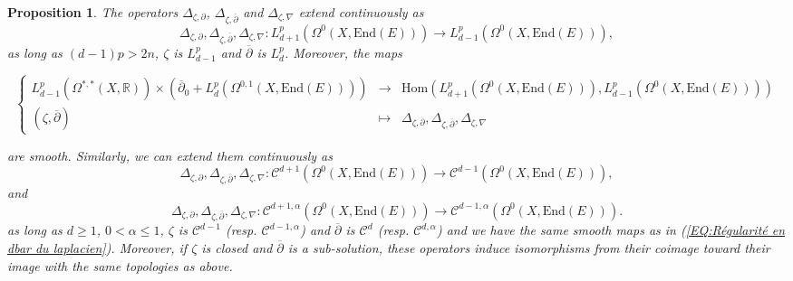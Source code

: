 \documentclass{article}
\newtheorem{proposition}[theorem]{Proposition}
\theoremstyle{remark}
\theoremstyle{definition}
\newcommand{\R}{\mathbb{R}}
\newcommand{\Hom}{\mathrm{Hom}}
\newcommand{\End}{\mathrm{End}}
\newcommand{\mC}{\mathcal{C}}
\newcommand{\dbar}{\overline{\partial}}
\renewcommand{\leq}{\leqslant}
\renewcommand{\geq}{\geqslant}
\newcommand{\fonction}[4]{\left\{ \begin{array}{rcl}
		\displaystyle #1 & \longrightarrow & \displaystyle #2\\
		\displaystyle #3 & \longmapsto & \displaystyle #4
	\end{array} \right.}
\begin{document}
\begin{proposition}\label{PRO:Régularité Z laplaciens}
    The operators $\Delta_{\zeta,\partial}$, $\Delta_{\zeta,\dbar}$ and $\Delta_{\zeta,\nabla}$ extend continuously as
    $$
    \Delta_{\zeta,\partial}, \Delta_{\zeta,\dbar}, \Delta_{\zeta,\nabla} : L_{d + 1}^p(\Omega^0(X,\End(E))) \rightarrow L_{d - 1}^p(\Omega^0(X,\End(E))),
    $$
    as long as $(d - 1)p > 2n$, $\zeta$ is $L_{d - 1}^p$ and $\dbar$ is $L_d^p$. Moreover, the maps
    \begin{adjustwidth}{-2cm}{-2cm}
    \begin{equation}\label{EQ:Régularité en dbar du laplacien}
        \fonction{L_{d - 1}^p(\Omega^{*,*}(X,\R)) \times (\dbar_0 + L_d^p(\Omega^{0,1}(X,\End(E))))}{\Hom(L_{d + 1}^p(\Omega^0(X,\End(E))),L_{d - 1}^p(\Omega^0(X,\End(E))))}{(\zeta,\dbar)}{\Delta_{\zeta,\partial}, \Delta_{\zeta,\dbar}, \Delta_{\zeta,\nabla}}
    \end{equation}
    \end{adjustwidth}
    are smooth. Similarly, we can extend them continuously as
    $$
    \Delta_{\zeta,\partial}, \Delta_{\zeta,\dbar}, \Delta_{\zeta,\nabla} : \mC^{d + 1}(\Omega^0(X,\End(E))) \rightarrow \mC^{d - 1}(\Omega^0(X,\End(E))),
    $$
    and
    $$
    \Delta_{\zeta,\partial}, \Delta_{\zeta,\dbar}, \Delta_{\zeta,\nabla} : \mC^{d + 1,\alpha}(\Omega^0(X,\End(E))) \rightarrow \mC^{d - 1,\alpha}(\Omega^0(X,\End(E))).
    $$
    as long as $d \geq 1$, $0 < \alpha \leq 1$, $\zeta$ is $\mC^{d - 1}$ (resp. $\mC^{d - 1,\alpha}$) and $\dbar$ is $\mC^d$ (resp. $\mC^{d,\alpha}$) and we have the same smooth maps as in (\ref{EQ:Régularité en dbar du laplacien}). Moreover, if $\zeta$ is closed and $\dbar$ is a sub-solution, these operators induce isomorphisms from their coimage toward their image with the same topologies as above.
\end{proposition}
\end{document}
